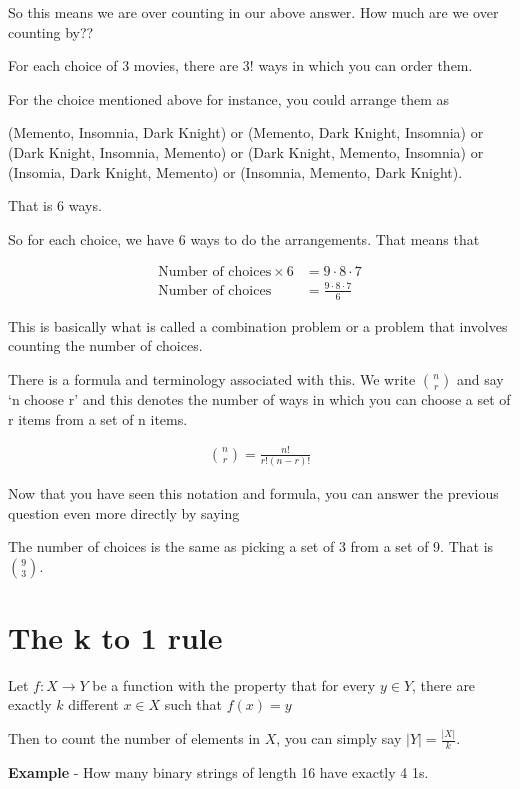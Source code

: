 \documentclass[12pt]{article}
\begin{document}
So this means we are over counting in our above answer. How much are we over counting by??

For each choice of 3 movies, there are 3! ways in which you can order them. 

For the choice mentioned above for instance, you could arrange them as

(Memento, Insomnia, Dark Knight) or (Memento, Dark Knight, Insomnia) or (Dark Knight, Insomnia, Memento) or (Dark Knight, Memento, Insomnia) or (Insomia, Dark Knight, Memento) or 
(Insomnia, Memento, Dark Knight). 

That is 6 ways.

So for each choice, we have 6 ways to do the arrangements. That means that

\begin{align*}
\text{Number of choices} \times 6 &= 9 \cdot 8 \cdot 7 \\
\text{Number of choices} &= \frac{9 \cdot 8 \cdot 7 }{6}
\end{align*}

This is basically what is called a combination problem or a problem that involves counting the number of choices.

There is a formula and terminology associated with this. We write ${n \choose r}$ and say `n choose r' and this denotes the number of ways in which you can choose a set of r items from a set of n items.

\begin{align*}
{n \choose r} = \frac{n!}{r!(n-r)!}
\end{align*}

Now that you have seen this notation and formula, you can answer the previous question even more directly by saying

The number of choices is the same as picking a set of 3 from a set of 9. That is $\binom{9}{3}$.

\section*{The k to 1 rule}
Let $f: X \rightarrow Y$ be a function with the property that for every $y \in Y$, there are exactly $k$ different $x \in X$ such that $f(x) = y$

Then to count the number of elements in $X$, you can simply say $|Y| = \frac{|X|}{k}$.

\medskip
\textbf{Example} - How many binary strings of length 16 have exactly 4 1s.
\end{document}

